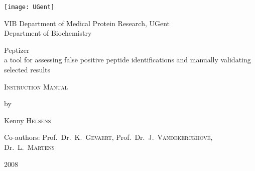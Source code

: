

\begin{titlepage}


\fontsize{12pt}{14pt}
\selectfont

\begin{center}

\texttt{[image: UGent]}

\vspace{0.5cm}

VIB Department of Medical Protein Research, UGent\\
Department of Biochemistry\\

\vspace{2.0cm}

\fontsize{17.28pt}{21pt}
\selectfont

Peptizer\\
a tool for assessing false positive peptide identifications and manually validating selected results\\

\fontsize{12pt}{14pt}
\selectfont

\vspace{2.5cm}

\textsc{Instruction Manual}

\vspace{.3cm}

by 

\vspace{.3cm}

Kenny \textsc{Helsens}

\vspace{0.6cm}


Co-authors: Prof.~Dr.~K.~\textsc{Gevaert}, Prof.~Dr.~J.~\textsc{Vandekerckhove}, Dr.~L.~\textsc{Martens}\\

\vspace{3cm}

2008

\end{center}
\end{titlepage}

\thispagestyle{empty}
